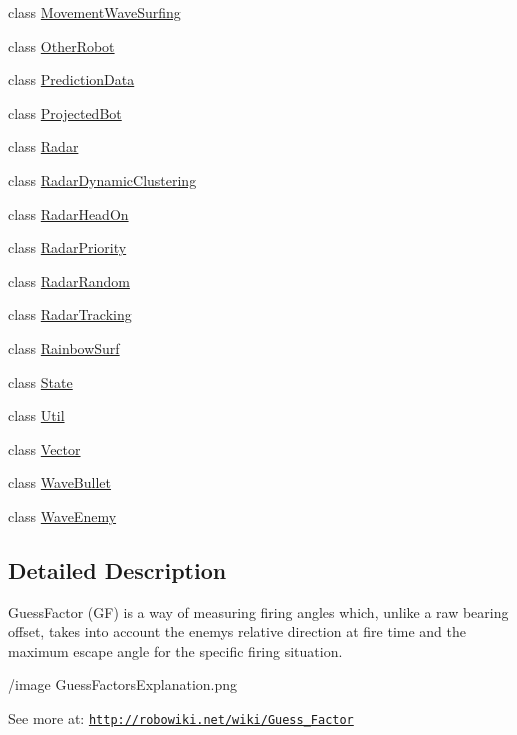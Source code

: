 \begin{DoxyCompactItemize}
class \hyperlink{classmega_1_1boirlerplate_1_1_movement_wave_surfing}{Movement\+Wave\+Surfing}
\item 
class \hyperlink{classmega_1_1boirlerplate_1_1_other_robot}{Other\+Robot}
\item 
class \hyperlink{classmega_1_1boirlerplate_1_1_prediction_data}{Prediction\+Data}
\item 
class \hyperlink{classmega_1_1boirlerplate_1_1_projected_bot}{Projected\+Bot}
\item 
class \hyperlink{classmega_1_1boirlerplate_1_1_radar}{Radar}
\item 
class \hyperlink{classmega_1_1boirlerplate_1_1_radar_dynamic_clustering}{Radar\+Dynamic\+Clustering}
\item 
class \hyperlink{classmega_1_1boirlerplate_1_1_radar_head_on}{Radar\+Head\+On}
\item 
class \hyperlink{classmega_1_1boirlerplate_1_1_radar_priority}{Radar\+Priority}
\item 
class \hyperlink{classmega_1_1boirlerplate_1_1_radar_random}{Radar\+Random}
\item 
class \hyperlink{classmega_1_1boirlerplate_1_1_radar_tracking}{Radar\+Tracking}
\item 
class \hyperlink{classmega_1_1boirlerplate_1_1_rainbow_surf}{Rainbow\+Surf}
\item 
class \hyperlink{classmega_1_1boirlerplate_1_1_state}{State}
\item 
class \hyperlink{classmega_1_1boirlerplate_1_1_util}{Util}
\item 
class \hyperlink{classmega_1_1boirlerplate_1_1_vector}{Vector}
\item 
class \hyperlink{classmega_1_1boirlerplate_1_1_wave_bullet}{Wave\+Bullet}
\item 
class \hyperlink{classmega_1_1boirlerplate_1_1_wave_enemy}{Wave\+Enemy}
\end{DoxyCompactItemize}


\subsection{Detailed Description}
Guess\+Factor (GF) is a way of measuring firing angles which, unlike a raw bearing offset, takes into account the enemy\textquotesingle{}s relative direction at fire time and the maximum escape angle for the specific firing situation.

/image Guess\+Factors\+Explanation.\+png

See more at\+: \href{http://robowiki.net/wiki/Guess_Factor}{\tt http\+://robowiki.\+net/wiki/\+Guess\+\_\+\+Factor}

